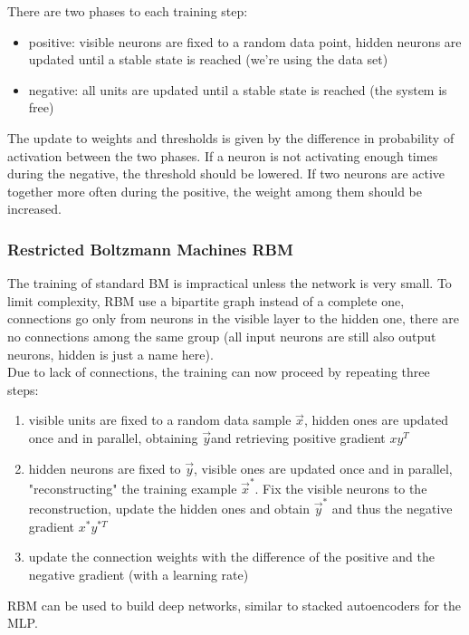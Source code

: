 There are two phases to each training step: 
\begin{itemize}
	\item positive: visible neurons are fixed to a random data point, hidden neurons are updated until a stable state is reached (we're using the data set)
	\item negative: all units are updated until a stable state is reached (the system is free)
\end{itemize}

The update to weights and thresholds is given by the difference in probability of activation between the two phases. If a neuron is not activating enough times during the negative, the threshold should be lowered. If two neurons are active together more often during the positive, the weight among them should be increased.\\

\subsubsection{Restricted Boltzmann Machines RBM}
The training of standard BM is impractical unless the network is very small. To limit complexity, RBM use a bipartite graph instead of a complete one, connections go only from neurons in the visible layer to the hidden one, there are no connections among the same group (all input neurons are still also output neurons, hidden is just a name here).\\

Due to lack of connections, the training can now proceed by repeating three steps: 
\begin{enumerate}
	\item visible units are fixed to a random data sample $\vec{x}$, hidden ones are updated once and in parallel, obtaining $\vec{y}$and retrieving positive gradient $xy^T$
	\item hidden neurons are fixed to $\vec{y}$, visible ones are updated once and in parallel, "reconstructing" the training example $\vec{x}^\ast$. Fix the visible neurons to the reconstruction, update the hidden ones and obtain $\vec{y}^\ast$ and thus the negative gradient $x^\ast y^{\ast T}$
	\item update the connection weights with the difference of the positive and the negative gradient (with a learning rate)
\end{enumerate}

RBM can be used to build deep networks, similar to stacked autoencoders for the MLP.\\

